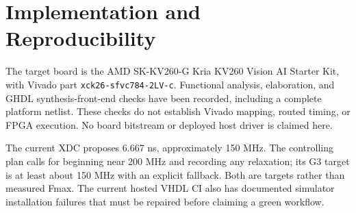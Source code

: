 \section{Implementation and Reproducibility}
\label{sec:implementation}
The target board is the AMD SK-KV260-G Kria KV260 Vision AI Starter Kit, with
Vivado part \texttt{xck26-sfvc784-2LV-c}. Functional analysis, elaboration, and
GHDL synthesis-front-end checks have been recorded, including a complete
platform netlist. These checks do not establish Vivado mapping, routed timing,
or FPGA execution. No board bitstream or deployed host driver is claimed here.

The current XDC proposes 6.667 ns, approximately 150 MHz. The controlling plan
calls for beginning near 200 MHz and recording any relaxation; its G3 target
is at least about 150 MHz with an explicit fallback. Both are targets rather
than measured Fmax. The current hosted VHDL CI also has documented simulator
installation failures that must be repaired before claiming a green workflow.

